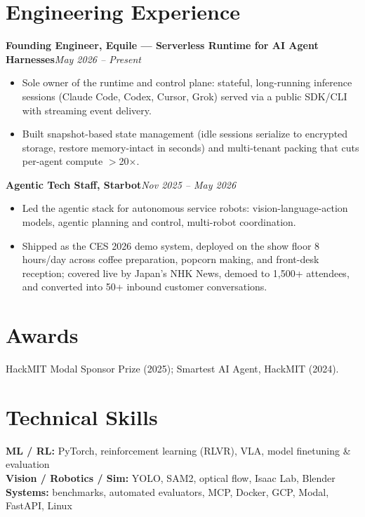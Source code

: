 \documentclass[9pt, letterpaper]{extarticle}
\newcommand{\role}[2]{%
  \vspace{2pt}%
  \noindent\textbf{#1}\hfill\textit{#2}\par\vspace{1pt}%
}
\begin{document}
\section{Engineering Experience}

\role{Founding Engineer, Equile --- Serverless Runtime for AI Agent Harnesses}{May 2026 -- Present}
\begin{itemize}
  \item Sole owner of the runtime and control plane: stateful, long-running inference sessions (Claude Code, Codex, Cursor, Grok) served via a public SDK/CLI with streaming event delivery.
  \item Built snapshot-based state management (idle sessions serialize to encrypted storage, restore memory-intact in seconds) and multi-tenant packing that cuts per-agent compute $>$20$\times$.
\end{itemize}

\role{Agentic Tech Staff, Starbot}{Nov 2025 -- May 2026}
\begin{itemize}
  \item Led the agentic stack for autonomous service robots: vision-language-action models, agentic planning and control, multi-robot coordination.
  \item Shipped as the CES 2026 demo system, deployed on the show floor 8 hours/day across coffee preparation, popcorn making, and front-desk reception; covered live by Japan's NHK News, demoed to 1{,}500+ attendees, and converted into 50+ inbound customer conversations.
\end{itemize}

\section{Awards}
HackMIT Modal Sponsor Prize (2025); Smartest AI Agent, HackMIT (2024).

\section{Technical Skills}
\textbf{ML / RL:} PyTorch, reinforcement learning (RLVR), VLA, model finetuning \& evaluation\\[0.5pt]
\textbf{Vision / Robotics / Sim:} YOLO, SAM2, optical flow, Isaac Lab, Blender\\[0.5pt]
\textbf{Systems:} benchmarks, automated evaluators, MCP, Docker, GCP, Modal, FastAPI, Linux
\end{document}
